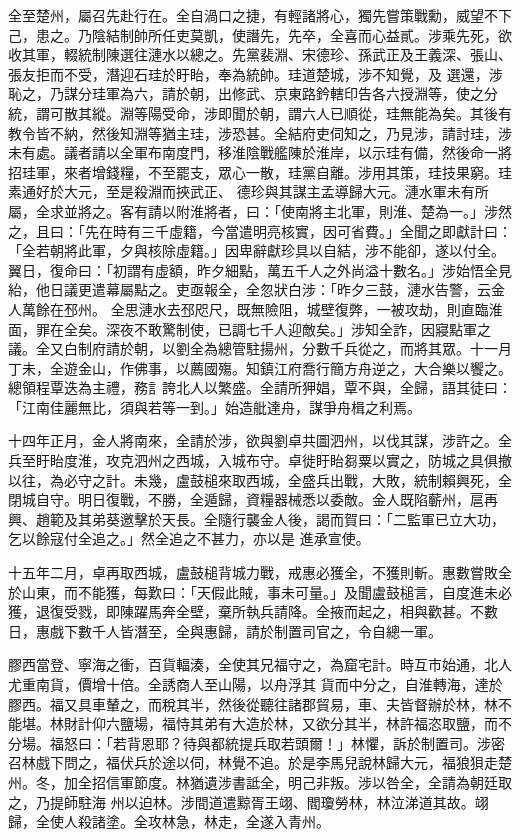 \begin{pinyinscope}
 全至楚州，屬召先赴行在。全自渦口之捷，有輕諸將心，獨先嘗策戰勳，威望不下己，患之。乃陰結制帥所任吏莫凱，使譖先，先卒，全喜而心益貳。涉乘先死，欲收其軍，輟統制陳選往漣水以總之。先黨裴淵、宋德珍、孫武正及王義深、張山、張友拒而不受，潛迎石珪於盱眙，奉為統帥。珪道楚城，涉不知覺，及
 選還，涉恥之，乃謀分珪軍為六，請於朝，出修武、京東路鈐轄印告各六授淵等，使之分統，謂可散其縱。淵等陽受命，涉即聞於朝，謂六人已順從，珪無能為矣。其後有教令皆不納，然後知淵等猶主珪，涉恐甚。全結府吏伺知之，乃見涉，請討珪，涉未有處。議者請以全軍布南度門，移淮陰戰艦陳於淮岸，以示珪有備，然後命一將招珪軍，來者增錢糧，不至罷支，眾心一散，珪黨自離。涉用其策，珪技果窮。珪素通好於大元，至是殺淵而挾武正、
 德珍與其謀主孟導歸大元。漣水軍未有所屬，全求並將之。客有請以附淮將者，曰：「使南將主北軍，則淮、楚為一。」涉然之，且曰：「先在時有三千虛籍，今當遣明亮核實，因可省費。」全聞之即獻計曰：「全若朝將此軍，夕與核除虛籍。」因卑辭獻珍具以自結，涉不能卻，遂以付全。翼日，復命曰：「初謂有虛額，昨夕細點，萬五千人之外尚溢十數名。」涉始悟全見紿，他日議更遣幕屬點之。吏亟報全，全忽狀白涉：「昨夕三鼓，漣水告警，云金人萬餘在邳州。
 全思漣水去邳咫尺，既無險阻，城壁復弊，一被攻劫，則直臨淮面，罪在全矣。深夜不敢驚制使，已調七千人迎敵矣。」涉知全詐，因寢點軍之議。全又白制府請於朝，以劉全為總管駐揚州，分數千兵從之，而將其眾。十一月丁未，全遊金山，作佛事，以薦國殤。知鎮江府喬行簡方舟逆之，大合樂以饗之。總領程覃迭為主禮，務訁誇北人以繁盛。全請所狎娼，覃不與，全歸，語其徒曰：「江南佳麗無比，須與若等一到。」始造舭達舟，謀爭舟楫之利焉。



 十四年正月，金人將南來，全請於涉，欲與劉卓共圖泗州，以伐其謀，涉許之。全兵至盱眙度淮，攻克泗州之西城，入城布守。卓徙盱眙芻粟以實之，防城之具俱撤以往，為必守之計。未幾，盧鼓槌來取西城，全盛兵出戰，大敗，統制賴興死，全閉城自守。明日復戰，不勝，全遁歸，資糧器械悉以委敵。金人既陷蘄州，扈再興、趙範及其弟葵邀擊於天長。全隨行襲金人後，謁而賀曰：「二監軍已立大功，乞以餘寇付全追之。」然全追之不甚力，亦以是
 進承宣使。



 十五年二月，卓再取西城，盧鼓槌背城力戰，戒惠必獲全，不獲則斬。惠數嘗敗全於山東，而不能獲，每歎曰：「天假此賊，事未可量。」及聞盧鼓槌言，自度進未必獲，退復受戮，即陳躍馬奔全壁，棄所執兵請降。全掖而起之，相與歡甚。不數日，惠戲下數千人皆潛至，全與惠歸，請於制置司官之，令自總一軍。



 膠西當登、寧海之衝，百貨輻湊，全使其兄福守之，為窟宅計。時互市始通，北人尤重南貨，價增十倍。全誘商人至山陽，以舟浮其
 貨而中分之，自淮轉海，達於膠西。福又具車輦之，而稅其半，然後從聽往諸郡貿易，車、夫皆督辦於林，林不能堪。林財計仰六鹽場，福恃其弟有大造於林，又欲分其半，林許福恣取鹽，而不分場。福怒曰：「若背恩耶？待與都統提兵取若頭爾！」林懼，訴於制置司。涉密召林戲下問之，福伏兵於途以伺，林覺不追。於是李馬兒說林歸大元，福狼狽走楚州。冬，加全招信軍節度。林猶遺涉書詆全，明己非叛。涉以咎全，全請為朝廷取之，乃提師駐海
 州以迫林。涉間道遣黥胥王翊、閻瓊勞林，林泣涕道其故。翊歸，全使人殺諸塗。全攻林急，林走，全遂入青州。




\end{pinyinscope}
